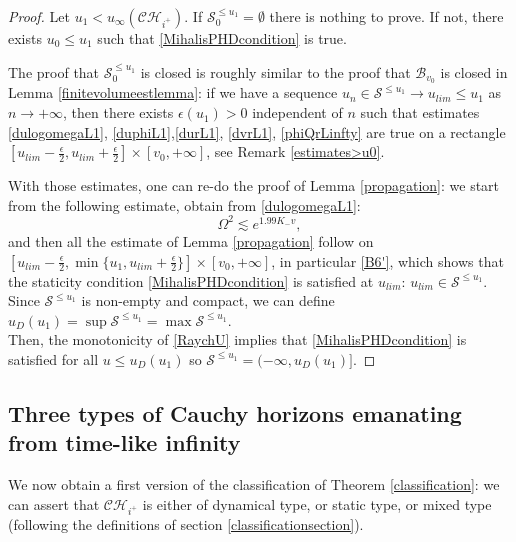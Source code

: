 \documentclass[10pt,a4paper]{article}
\theoremstyle{plain}
\theoremstyle{remark}
\theoremstyle{definition}
\theoremstyle{plain}
\theoremstyle{remark}
\theoremstyle{definition}
\newcommand{\CH}{\mathcal{CH}_{i^+}}
\numberwithin{equation}{section}
\begin{document}
\begin{proof} Let $u_1 <u_{\infty}(\CH)$. If $ \mathcal{S}_0^{\leq u_1} = \emptyset$ there is nothing to prove. If not, there exists $u_0 \leq u_1$ such that \eqref{MihalisPHDcondition} is true. 
	
	The proof that $\mathcal{S}_0^{\leq u_1}$ is closed is roughly similar to the proof that $\mathcal{B}_{v_0}$ is closed in Lemma \ref{finitevolumeestlemma}: if we have a sequence $u_n \in \mathcal{S}^{\leq u_1} \rightarrow u_{lim} \leq u_1$ as $n \rightarrow +\infty$, then there exists $\epsilon(u_1)>0$ independent of $n$ such that estimates \eqref{dulogomegaL1}, \eqref{duphiL1},\eqref{durL1}, \eqref{dvrL1}, \eqref{phiQrLinfty} are true on a rectangle $[u_{lim}-\frac{\epsilon}{2} , u_{lim}+\frac{\epsilon}{2} ] \times [v_0,+\infty]$, see Remark \ref{estimates>u0}. 
	
	With those estimates, one can re-do the proof of Lemma \ref{propagation}: we start from the following estimate, obtain from \eqref{dulogomegaL1}: $$\Omega^2 \lesssim e^{1.99K_-v},$$
	and then all the estimate of Lemma \ref{propagation} follow on $[u_{lim}-\frac{\epsilon}{2} , \min\{u_1, u_{lim}+\frac{\epsilon}{2}\}] \times [v_0,+\infty]$, in particular \eqref{B6'}, which shows that the staticity condition \eqref{MihalisPHDcondition} is satisfied at $u_{lim}$: $u_{lim} \in \mathcal{S}^{\leq u_1}$. \\	
	Since $\mathcal{S}^{\leq u_1}$ is non-empty and compact, we can define $u_D(u_1)=\sup \mathcal{S}^{\leq u_1}= \max \mathcal{S}^{\leq u_1}$. \\ Then, the monotonicity of \eqref{RaychU} implies that \eqref{MihalisPHDcondition} is satisfied for all $u \leq u_D(u_1)$ so $\mathcal{S}^{\leq u_1}=(-\infty,u_D(u_1)]$.
	
\end{proof}

\subsection{Three types of Cauchy horizons emanating from time-like infinity}  \label{classificationsection2}
We now obtain a first version of the classification of Theorem \ref{classification}: we can assert that $\CH$ is either of dynamical type, or static type, or mixed type (following the definitions of section \ref{classificationsection}).
\end{document}
